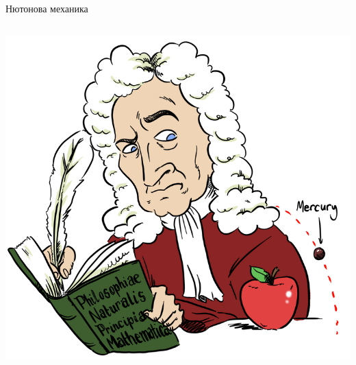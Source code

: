 \documentclass[10pt,a4paper]{beamer}
\begin{document}
        \begin{frame}{ Нютонова механика }
            \begin{columns}
                \begin{column}{0.5\textwidth}
                    \includegraphics[width=\textwidth]{images/newton_mercury_perih.png}
                \end{column}
            \end{columns}
        \end{frame}
    
\end{document}
